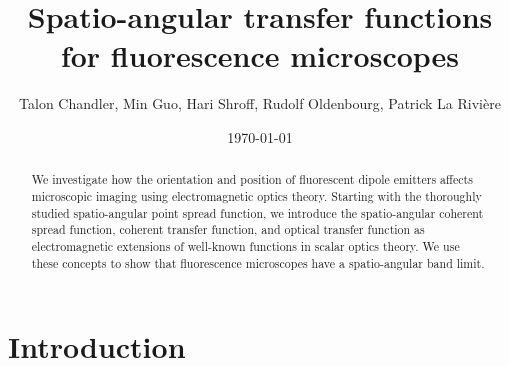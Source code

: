 \documentclass[11pt]{article}
\begin{document}
\title{\vspace{-2.5em} Spatio-angular transfer functions for fluorescence microscopes\vspace{-1em}}  \author{Talon Chandler, Min Guo, Hari Shroff, Rudolf Oldenbourg, Patrick La Rivi\`ere}
\date{\vspace{-1em}\today\vspace{-1em}}
\maketitle
\begin{abstract}
  We investigate how the orientation and position of fluorescent dipole emitters
  affects microscopic imaging using electromagnetic optics theory. Starting with
  the thoroughly studied spatio-angular point spread function, we introduce the
  spatio-angular coherent spread function, coherent transfer function, and
  optical transfer function as electromagnetic extensions of well-known
  functions in scalar optics theory. We use these concepts to show that
  fluorescence microscopes have a spatio-angular band limit. 
\end{abstract}
\section{Introduction}
\end{document}
